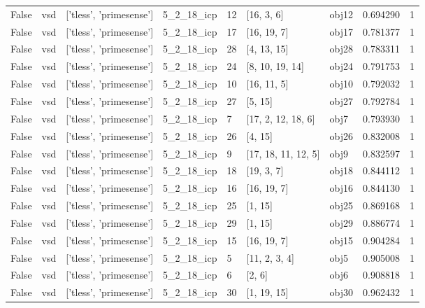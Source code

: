 \documentclass[a4paper,table]{article}
\begin{document}
\begin{adjustbox}{max width=\textwidth}
\begin{tabular}{lllllllrl}
   False &        vsd &  ['tless', 'primesense'] &  5\_2\_18\_icp &       12 &             [16, 3, 6] &    obj12 &     0.694290 &   1 \\
   False &        vsd &  ['tless', 'primesense'] &  5\_2\_18\_icp &       17 &            [16, 19, 7] &    obj17 &     0.781377 &   1 \\
   False &        vsd &  ['tless', 'primesense'] &  5\_2\_18\_icp &       28 &            [4, 13, 15] &    obj28 &     0.783311 &   1 \\
   False &        vsd &  ['tless', 'primesense'] &  5\_2\_18\_icp &       24 &        [8, 10, 19, 14] &    obj24 &     0.791753 &   1 \\
   False &        vsd &  ['tless', 'primesense'] &  5\_2\_18\_icp &       10 &            [16, 11, 5] &    obj10 &     0.792032 &   1 \\
   False &        vsd &  ['tless', 'primesense'] &  5\_2\_18\_icp &       27 &                [5, 15] &    obj27 &     0.792784 &   1 \\
   False &        vsd &  ['tless', 'primesense'] &  5\_2\_18\_icp &        7 &     [17, 2, 12, 18, 6] &     obj7 &     0.793930 &   1 \\
   False &        vsd &  ['tless', 'primesense'] &  5\_2\_18\_icp &       26 &                [4, 15] &    obj26 &     0.832008 &   1 \\
   False &        vsd &  ['tless', 'primesense'] &  5\_2\_18\_icp &        9 &    [17, 18, 11, 12, 5] &     obj9 &     0.832597 &   1 \\
   False &        vsd &  ['tless', 'primesense'] &  5\_2\_18\_icp &       18 &             [19, 3, 7] &    obj18 &     0.844112 &   1 \\
   False &        vsd &  ['tless', 'primesense'] &  5\_2\_18\_icp &       16 &            [16, 19, 7] &    obj16 &     0.844130 &   1 \\
   False &        vsd &  ['tless', 'primesense'] &  5\_2\_18\_icp &       25 &                [1, 15] &    obj25 &     0.869168 &   1 \\
   False &        vsd &  ['tless', 'primesense'] &  5\_2\_18\_icp &       29 &                [1, 15] &    obj29 &     0.886774 &   1 \\
   False &        vsd &  ['tless', 'primesense'] &  5\_2\_18\_icp &       15 &            [16, 19, 7] &    obj15 &     0.904284 &   1 \\
   False &        vsd &  ['tless', 'primesense'] &  5\_2\_18\_icp &        5 &          [11, 2, 3, 4] &     obj5 &     0.905008 &   1 \\
   False &        vsd &  ['tless', 'primesense'] &  5\_2\_18\_icp &        6 &                 [2, 6] &     obj6 &     0.908818 &   1 \\
   False &        vsd &  ['tless', 'primesense'] &  5\_2\_18\_icp &       30 &            [1, 19, 15] &    obj30 &     0.962432 &   1 \\
\bottomrule
\end{tabular}
\end{adjustbox}
\end{document}
